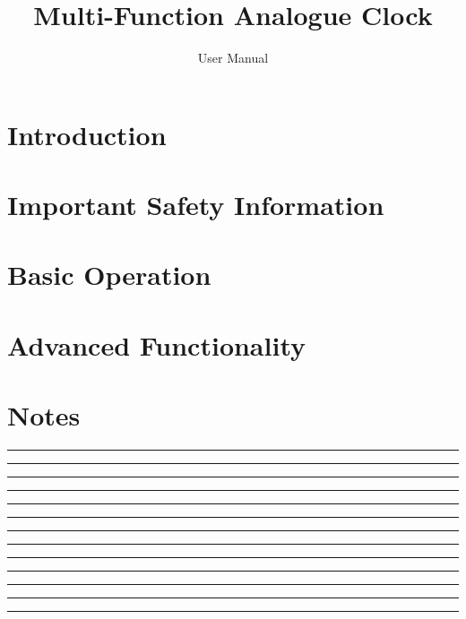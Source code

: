 \documentclass[11pt,a4paper,twoside,titlepage]{scrartcl}
\title{\vspace{-24pt}\Huge Multi-Function Analogue Clock}
\subtitle{\vspace{8pt}\LARGE User Manual}
\author{}
\date{\vspace{12pt}\missingfigure{Beautiful illustration of the finished clock}}
\begin{document}
\maketitle


\section{Introduction}


\clearpage
\section{Important Safety Information}


\clearpage
\section{Basic Operation}


\clearpage
\section{Advanced Functionality}



\clearpage
\appendix
\appendixpage



\clearpage
\section{Notes}
\vspace{1cm}
\noindent\rule{\textwidth}{0.2pt}
\vspace{1cm}
\noindent\rule{\textwidth}{0.2pt}
\vspace{1cm}
\noindent\rule{\textwidth}{0.2pt}
\vspace{1cm}
\noindent\rule{\textwidth}{0.2pt}
\vspace{1cm}
\noindent\rule{\textwidth}{0.2pt}
\vspace{1cm}
\noindent\rule{\textwidth}{0.2pt}
\vspace{1cm}
\noindent\rule{\textwidth}{0.2pt}
\vspace{1cm}
\noindent\rule{\textwidth}{0.2pt}
\vspace{1cm}
\noindent\rule{\textwidth}{0.2pt}
\vspace{1cm}
\noindent\rule{\textwidth}{0.2pt}
\vspace{1cm}
\noindent\rule{\textwidth}{0.2pt}
\vspace{1cm}
\noindent\rule{\textwidth}{0.2pt}
\vspace{1cm}
\noindent\rule{\textwidth}{0.2pt}
\vspace{1cm}
\end{document}
